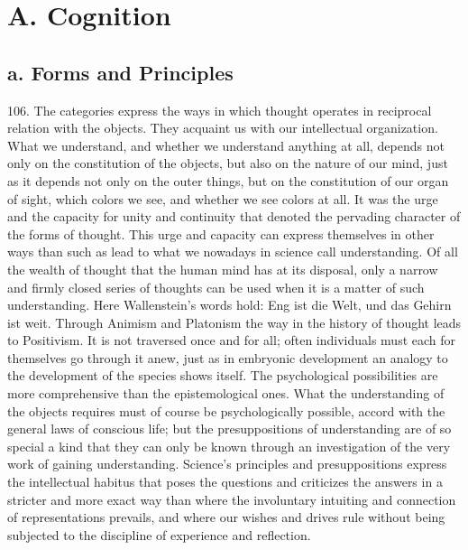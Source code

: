 \documentclass[12pt,a4paper]{book}
\newcommand{\opage}[1]{\marginnote{\footnotesize\textit{[#1]}}}
\begin{document}
\section*{A. Cognition}
\label{sec:erkendelse}

\subsection*{a. Forms and Principles}

106. The categories express the ways in which thought operates in reciprocal
relation with the objects. They acquaint us with our intellectual
organization. What we understand, and whether we understand anything at all,
depends not only on the constitution of the objects, but also on the nature
of our mind, just as it depends not only on the outer things, but on the
constitution of our organ of sight, which colors we see, and whether we see
colors at all. It was the urge and the capacity for unity and continuity that
denoted the pervading character of the forms of thought. This urge and
capacity can express themselves in other ways than such as lead to what we
nowadays in science call understanding. Of all the wealth of thought that the
human mind has at its disposal, only a narrow and firmly closed series of
thoughts can be used when it is a matter of such understanding. Here
Wallenstein's words hold: Eng ist die Welt, und das Gehirn ist weit. Through
Animism and Platonism the way in the history of thought leads to Positivism.
It is not traversed once and for all; often individuals must each \opage{255}for
themselves go through it anew, just as in embryonic development an analogy to
the development of the species shows itself. The psychological possibilities
are more comprehensive than the epistemological ones. What the understanding
of the objects requires must of course be psychologically possible, accord
with the general laws of conscious life; but the presuppositions of
understanding are of so special a kind that they can only be known through an
investigation of the very work of gaining understanding. Science's principles
and presuppositions express the intellectual habitus that poses the questions
and criticizes the answers in a stricter and more exact way than where the
involuntary intuiting and connection of representations prevails, and where
our wishes and drives rule without being subjected to the discipline of
experience and reflection.
\end{document}
